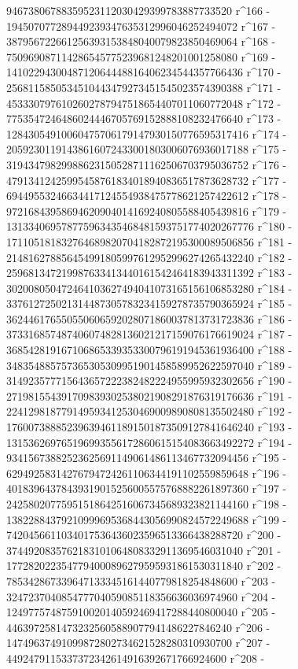        94673806788359523112030429399783887733520 r^166 - 
       194507077289449239347635312996046252494072 r^167 - 
       387956722661256393153848040079823850469064 r^168 - 
       750969087114286545775239681248201001258080 r^169 - 
       1410229430048712064448816406234544357766436 r^170 - 
       2568115850534510443479273451545023574390388 r^171 - 
       4533307976102602787947518654407011060772048 r^172 - 
       7753547246486024446705769152888108232476640 r^173 - 
       12843054910060475706179147930150776595317416 r^174 - 
       20592301191438616072433001803006076936017188 r^175 - 
       31943479829988623150528711162506703795036752 r^176 - 
       47913412425995458761834018940836517873628732 r^177 - 
       69449553246634417124554938475778621257422612 r^178 - 
       97216843958694620904014169240805588405439816 r^179 - 
       131334069578775963435468481593751774020267776 r^180 - 
       171105181832764689820704182872195300089506856 r^181 - 
       214816278856454991805997612952996274265432240 r^182 - 
       259681347219987633413440161542464183943311392 r^183 - 
       302008050472464103627494041073165156106853280 r^184 - 
       337612725021314487305783234159278735790365924 r^185 - 
       362446176550550606592028071860037813731723836 r^186 - 
       373316857487406074828136021217159076176619024 r^187 - 
       368542819167106865339353300796191945361936400 r^188 - 
       348354885757365305309951901458589952622597040 r^189 - 
       314923577715643657222382482224955995932302656 r^190 - 
       271981554391709839302538021908291876319176636 r^191 - 
       224129818779149593412530469009890808135502480 r^192 - 
       176007388852396394611891501873509127841646240 r^193 - 
       131536269765196993556172860615154083663492272 r^194 - 
       93415673882523625691149061486113467732094456 r^195 - 
       62949258314276794724261106344191102559859648 r^196 - 
       40183964378439319015256005575768882261897360 r^197 - 
       24258020775951518642516067345689323821144160 r^198 - 
       13822884379210999695368443056990824572249688 r^199 - 
       7420456611034017536436023596513366438288720 r^200 - 
       3744920835762183101064808332911369546031040 r^201 - 
       1772820223547794000896279595931861530311840 r^202 - 
       785342867339647133345161440779818254848600 r^203 - 
       324723704085477704059085118356636036974960 r^204 - 
       124977574875910020140592469417288440800040 r^205 - 
       44639725814732325605889077941486227846240 r^206 - 
       14749637491099872802734621528280310930700 r^207 - 
       4492479115337372342614916392671766924600 r^208 - 
